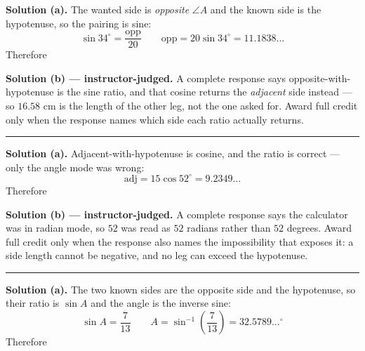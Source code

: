 \documentclass[12pt]{article}
\begin{document}




\noindent\textbf{Solution (a).} The wanted side is \emph{opposite} $\angle A$
and the known side is the hypotenuse, so the pairing is sine:
\[ \sin 34^\circ = \frac{\text{opp}}{20} \qquad \text{opp} = 20\sin 34^\circ = 11.1838\ldots \]
Therefore 

\noindent\textbf{Solution (b) --- instructor-judged.} A complete response says
opposite-with-hypotenuse is the sine ratio, and that cosine returns the
\emph{adjacent} side instead --- so $16.58$ cm is the length of the other leg,
not the one asked for. Award full credit only when the response names which side
each ratio actually returns.

\vspace{0.15cm}\noindent\rule{\linewidth}{0.2pt}


\noindent\textbf{Solution (a).} Adjacent-with-hypotenuse is cosine, and the ratio
is correct --- only the angle mode was wrong:
\[ \text{adj} = 15\cos 52^\circ = 9.2349\ldots \]
Therefore 

\noindent\textbf{Solution (b) --- instructor-judged.} A complete response says
the calculator was in radian mode, so $52$ was read as $52$ radians rather than
$52$ degrees. Award full credit only when the response also names the
impossibility that exposes it: a side length cannot be negative, and no leg can
exceed the hypotenuse.

\vspace{0.15cm}\noindent\rule{\linewidth}{0.2pt}


\noindent\textbf{Solution (a).} The two known sides are the opposite side and
the hypotenuse, so their ratio is $\sin A$ and the angle is the inverse sine:
\[ \sin A = \frac{7}{13} \qquad A = \sin^{-1}\!\left(\frac{7}{13}\right) = 32.5789\ldots^\circ \]
Therefore 
\end{document}
